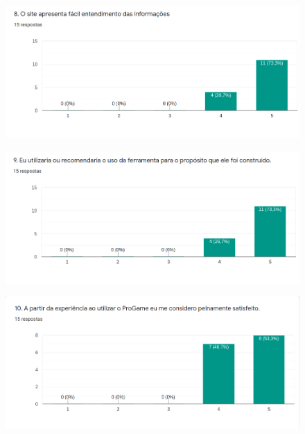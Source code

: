 \begin{apendicesenv}
\begin{figure}[h]
	\centering
	\includegraphics[keepaspectratio=true,scale=0.4]{figuras/8.png}
\end{figure}

\begin{figure}[h]
	\centering
	\includegraphics[keepaspectratio=true,scale=0.4]{figuras/9.png}
\end{figure}

\begin{figure}[h]
	\centering
	\includegraphics[keepaspectratio=true,scale=0.4]{figuras/10.png}
\end{figure}



\end{apendicesenv}
